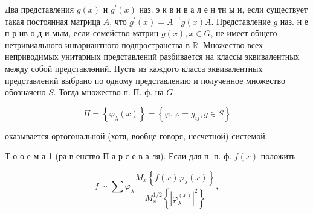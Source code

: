 \documentclass[10pt]{article}
\begin{document}
Два представления $g(x)$ и $g^{\prime}(x)$ наз. э к в и в а л е н тн ы и, если существует такая постоянная матрица $A$, что $g^{\prime}(x)=A^{-1} g(x) A$. Представление $g$ наз. н е п р ив о д и мым, если семейство матриц $g(x), x \in G$, не имеет общего нетривиального инвариантного подпространства в $\mathbb{R}$. Множество всех неприводимых унитарных представлений разбивается на классы эквивалентных между собой представлөний. Пусть из каждого класса эквивалентных представлений выбрано по одному представлению и полученное множество обозначено $S$. Тогда множество п. П. ф. на $G$



\[

H=\left\{\varphi_{\lambda}(x)\right\}=\left\{\varphi, \varphi=g_{i j}, g \in S\right\}

\]



оказывается ортогональной (хотя, вообце говоря, несчетной) системой.



Т о о е м а 1 (ра в енство П а р с е в а ля). Если для п. п. ф. $f(x)$ положить



\[

f \sim \sum \varphi_{\lambda} \frac{M_{x}\left\{f(x) \bar{\varphi}_{\lambda}(x)\right\}}{M_{x}^{1 / 2}\left\{\left|\varphi_{\lambda}^{(x)}\right|^{2}\right\}},

\]
\end{document}
